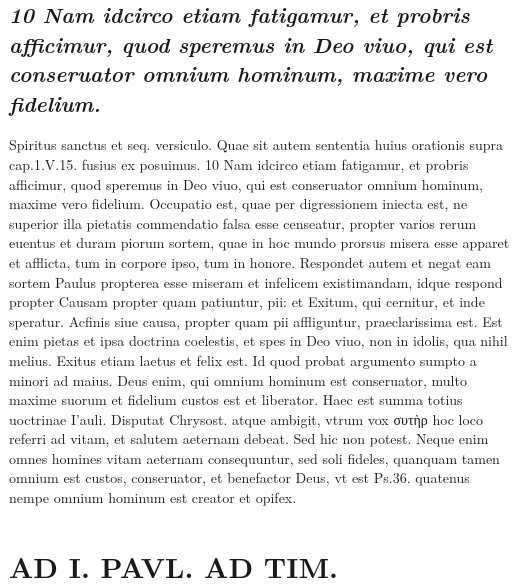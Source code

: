 \documentclass{article}
\begin{document}
\begin{pages}
\subsection*{\textit{10 Nam idcirco etiam fatigamur, et probris afficimur, quod speremus in Deo viuo, qui est conseruator omnium hominum, maxime vero fidelium.}}Spiritus sanctus et seq. versiculo. Quae sit autem sententia huius orationis supra cap.1.V.15. fusius ex posuimus. 10 Nam idcirco etiam fatigamur, et probris afficimur, quod speremus in Deo viuo, qui est conseruator omnium hominum, maxime vero fidelium. Occupatio est, quae per digressionem iniecta est, ne superior illa pietatis commendatio falsa esse censeatur, propter varios rerum euentus et duram piorum sortem, quae in hoc mundo prorsus misera esse apparet et afflicta, tum in corpore ipso, tum in honore. Respondet autem et negat eam sortem Paulus propterea esse miseram et infelicem existimandam, idque respond propter Causam propter quam patiuntur, pii: et Exitum, qui cernitur, et inde speratur. Acfinis siue causa, propter quam pii affliguntur, praeclarissima est. Est enim pietas et ipsa doctrina coelestis, et spes in Deo viuo, non in idolis, qua nihil melius. Exitus etiam laetus et felix est. Id quod probat argumento sumpto a minori ad maius. Deus enim, qui omnium hominum est conseruator, multo maxime suorum et fidelium custos est et liberator. Haec est summa totius uoctrinae I'auli. Disputat Chrysost. atque ambigit, vtrum vox συτὴρ hoc loco referri ad vitam, et salutem aeternam debeat. Sed hic non potest. Neque enim omnes homines vitam aeternam consequuntur, sed soli fideles, quanquam tamen omnium est custos, conseruator, et benefactor Deus, vt est Ps.36. quatenus nempe omnium hominum est creator et opifex.  \pend
\section*{AD I. PAVL. AD TIM. }
\marginpar{[ p.226 ]}\pstart {}
{}

\end{pages}
\end{document}
